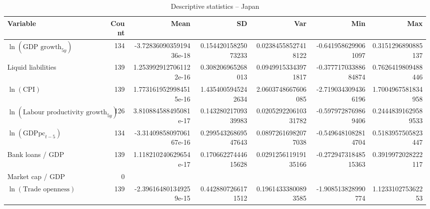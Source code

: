 \begin{table}[!htbp]
\centering
\caption{Descriptive statistics -- Japan}
\footnotesize
\begin{tabular}{lrrrrrr}
\toprule
Variable & Count & Mean & SD & Var & Min & Max \\
\midrule
$\ln(\text{GDP growth}_{5y})$ & 134 & -3.7283609035919436e-18 & 0.15442015825073233 & 0.02384558527418122 & -0.6419586299061097 & 0.3151296890885137 \\
Liquid liabilities & 139 & 1.2539929127061122e-16 & 0.308206965268013 & 0.09499153343971817 & -0.37771703388684874 & 0.7626419809488446 \\
$\ln(\text{CPI})$ & 139 & 1.7731619529984515e-16 & 1.4354005945242634 & 2.0603748667606085 & -2.7190343094366196 & 1.7004967581834958 \\
$\ln(\text{Labour productivity growth}_{5y})$ & 126 & 3.810884588495081e-17 & 0.14328021709339983 & 0.020529220610331782 & -0.5979728769869406 & 0.24448391629589533 \\
$\ln(\text{GDPpc}_{t-5})$ & 134 & -3.3140985809706167e-16 & 0.29954326869547643 & 0.08972616982077038 & -0.5496481082814704 & 0.5183957505823447 \\
Bank loans / GDP & 139 & 1.118210240629654e-17 & 0.17066227444615628 & 0.029125611919135166 & -0.27294731848515363 & 0.3919972028222117 \\
Market cap / GDP & 0 &  &  &  &  &  \\
$\ln(\text{Trade openness})$ & 139 & -2.396164801349259e-15 & 0.4428807266171512 & 0.19614333800893585 & -1.908513828990774 & 1.123310275362253 \\
\bottomrule
\end{tabular}
\end{table}


